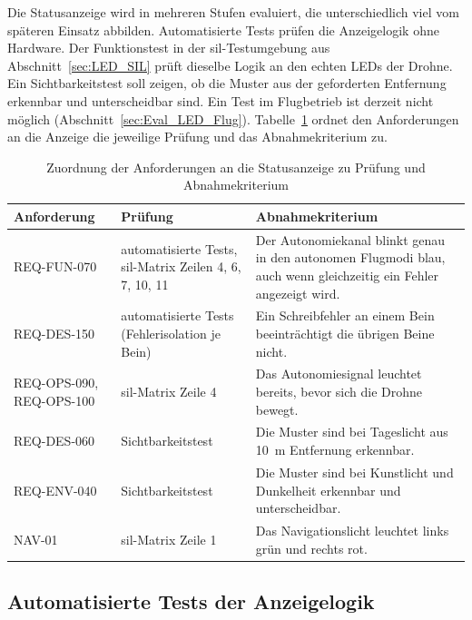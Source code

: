     Die Statusanzeige wird in mehreren Stufen evaluiert, die unterschiedlich viel vom späteren Einsatz abbilden. Automatisierte Tests prüfen die Anzeigelogik ohne Hardware. Der Funktionstest in der \gls{sil}-Testumgebung aus Abschnitt~\ref{sec:LED_SIL} prüft dieselbe Logik an den echten LEDs der Drohne. Ein Sichtbarkeitstest soll zeigen, ob die Muster aus der geforderten Entfernung erkennbar und unterscheidbar sind. Ein Test im Flugbetrieb ist derzeit nicht möglich (Abschnitt~\ref{sec:Eval_LED_Flug}). Tabelle~\ref{tab:Eval_LED_Anforderungen} ordnet den Anforderungen an die Anzeige die jeweilige Prüfung und das Abnahmekriterium zu.

    \begin{table}[H]
        \centering
        \caption{Zuordnung der Anforderungen an die Statusanzeige zu Prüfung und Abnahmekriterium}
        \label{tab:Eval_LED_Anforderungen}
        \small
        \begin{tabularx}{\textwidth}{>{\raggedright\arraybackslash}p{2.6cm} >{\raggedright\arraybackslash}p{4.0cm} X}
            \toprule
            \textbf{Anforderung} & \textbf{Prüfung} & \textbf{Abnahmekriterium} \\
            \midrule
            REQ-FUN-070 & automatisierte Tests, \gls{sil}-Matrix Zeilen 4, 6, 7, 10, 11 & Der Autonomiekanal blinkt genau in den autonomen Flugmodi blau, auch wenn gleichzeitig ein Fehler angezeigt wird. \\
            REQ-DES-150 & automatisierte Tests (Fehlerisolation je Bein) & Ein Schreibfehler an einem Bein beeinträchtigt die übrigen Beine nicht. \\
            REQ-OPS-090, REQ-OPS-100 & \gls{sil}-Matrix Zeile 4 & Das Autonomiesignal leuchtet bereits, bevor sich die Drohne bewegt. \\
            REQ-DES-060 & Sichtbarkeitstest & Die Muster sind bei Tageslicht aus \SI{10}{\metre} Entfernung erkennbar. \\
            REQ-ENV-040 & Sichtbarkeitstest & Die Muster sind bei Kunstlicht und Dunkelheit erkennbar und unterscheidbar. \\
            NAV-01 & \gls{sil}-Matrix Zeile 1 & Das Navigationslicht leuchtet links grün und rechts rot. \\
            \bottomrule
        \end{tabularx}
    \end{table}

        \subsection{Automatisierte Tests der Anzeigelogik}
        \label{sec:Eval_LED_Tests}

